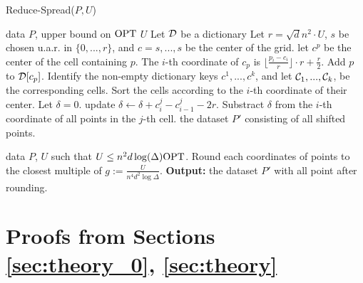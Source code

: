 \begin{algorithm}[tb]
   \caption{Reduce-Spread($P, U$)}
   \label{alg:reduce-diam}
\begin{algorithmic}[1]
 \Comment data $P$, upper bound on $\text{OPT}$ $U$
   \State Let $\mathcal D$ be a dictionary
   \State Let $r = \sqrt d n^2\cdot U$, $s$ be chosen u.a.r. in $\{0, ..., r\}$, and $c = {s, ..., s}$ be the center of the grid.
   \State let $c^p$ be the center of the cell containing $p$. The $i$-th coordinate of $c_p$ is $\lfloor \frac{p_i - c_i}{r}\rfloor  \cdot r + \frac{r}{2}$.
   Add $p$ to $\mathcal D[c_p]$.
   \EndFor
   \State Identify the non-empty dictionary keys $c^1, ..., c^k$, and let $\mathcal C_1, ..., \mathcal C_k$, be the corresponding cells.
   \State Sort the cells according to the $i$-th coordinate of their center. Let $\delta = 0$. 
     update $\delta \gets \delta + c^j_i - c^j_{i-1} - 2r$.
	\EndIf    
    \State Substract $\delta$ from the $i$-th coordinate of all points in the $j$-th cell. 
    \EndFor
   \EndFor
    the dataset $P'$ consisting of all shifted points.
   \EndProcedure
   
    \Comment data $P$, $U$ such that $U \leq n^2 d \log(\Delta) \text{OPT}$.
   \State Round each coordinates of points to the closest multiple of $g := \frac{U}{n^4 d^2 \log \Delta}$.
   \State \textbf{Output:} the dataset $P'$ with all point after rounding.
   \EndProcedure
\end{algorithmic}
\end{algorithm}

\section{Proofs from Sections \ref{sec:theory_0}, \ref{sec:theory}}\label{app:theory}
